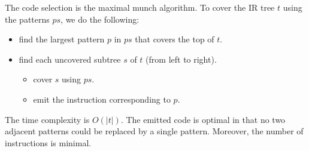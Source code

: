 \documentclass[a4paper, openany]{memoir}
\begin{document}
The code selection is the maximal munch algorithm. To cover the IR tree $t$ using the patterns $ps$, we do the following:
\begin{itemize}
    \item find the largest pattern $p$ in $ps$ that covers the top of $t$.
    \item find each uncovered subtree $s$ of $t$ (from left to right).
    \begin{itemize}
        \item cover $s$ using $ps$.
        \item emit the instruction corresponding to $p$.
    \end{itemize}
\end{itemize}
The time complexity is $O(|t|)$. The emitted code is optimal in that no two adjacent patterns could be replaced by a single pattern. Moreover, the number of instructions is minimal.
\end{document}

